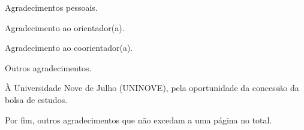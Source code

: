 \centeredchapterstyle
\begin{agradecimentos}
    \noindent Agradecimentos pessoais. \newline

    \noindent Agradecimento ao orientador(a).\newline
    
    \noindent Agradecimento ao coorientador(a).\newline
    
    \noindent Outros agradecimentos.\newline
    
    \noindent À Universidade Nove de Julho (UNINOVE), pela oportunidade da concessão da bolsa de estudos.\newline
    
    \noindent Por fim, outros agradecimentos que não excedam a uma página no total.
\end{agradecimentos}
